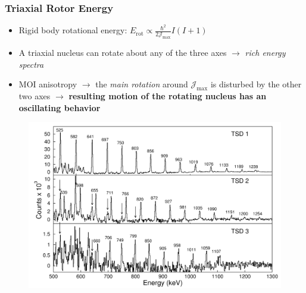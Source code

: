 \documentclass{beamer}
\begin{document}
\begin{frame}
  \frametitle{Triaxial Rotor Energy}
  \begin{itemize}
    \item Rigid body rotational energy: $E_\text{rot}\propto\frac{\hbar^2}{2\mathcal{J}_\text{max}}I(I+1 )$
    \item A triaxial nucleus can rotate about any of the three axes $\rightarrow$ \emph{rich energy spectra} 
    \item MOI anisotropy $\rightarrow$ the \emph{main rotation} around $\mathcal{J}_\text{max}$ is disturbed by the other two axes  $\rightarrow$ \textbf{resulting motion of the rotating nucleus has an oscillating behavior}
  \end{itemize}
  \begin{figure}
    \centering
    \includegraphics[scale=0.10]{Figs/collective-spectra.pdf}

\end{figure}
\end{frame}
\end{document}
